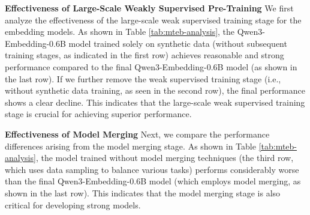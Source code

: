 \noindent \textbf{Effectiveness of Large-Scale Weakly Supervised Pre-Training}
We first analyze the effectiveness of the large-scale weak supervised training stage for the embedding models. As shown in Table \ref{tab:mteb-analysis}, the Qwen3-Embedding-0.6B model trained solely on synthetic data (without subsequent training stages, as indicated in the first row) achieves reasonable and strong performance compared to the final Qwen3-Embedding-0.6B model (as shown in the last row). If we further remove the weak supervised training stage (i.e., without synthetic data training, as seen in the second row), the final performance shows a clear decline. This indicates that the large-scale weak supervised training stage is crucial for achieving superior performance.


\noindent \textbf{Effectiveness of Model Merging}
Next, we compare the performance differences arising from the model merging stage. As shown in Table \ref{tab:mteb-analysis}, the model trained without model merging techniques (the third row, which uses data sampling to balance various tasks) performs considerably worse than the final Qwen3-Embedding-0.6B model (which employs model merging, as shown in the last row). This indicates that the model merging stage is also critical for developing strong models.




